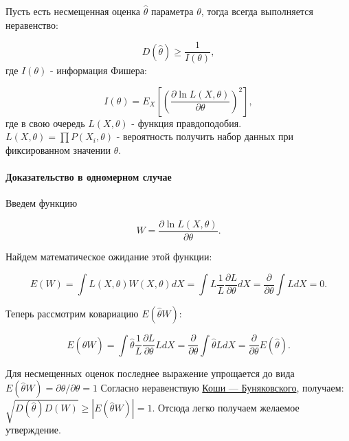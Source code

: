 Пусть есть несмещенная оценка $\hat\theta$ параметра $\theta$, тогда
всегда выполняется неравенство:

\begin{equation}
  D(\hat\theta) \geq \frac{1}{I(\theta)},
\end{equation} где $I(\theta)$ - информация Фишера:

\begin{equation}
  I(\theta) = E_X \left[\left( \frac{\partial \ln L(X,\theta)}{\partial \theta} \right)^2 \right],
\end{equation} где в свою очередь $L(X, \theta)$ - функция
правдоподобия. $L(X,\theta) = \prod{P(X_i,\theta)}$ - вероятность
получить набор данных при фиксированном значении $\theta$.

\paragraph{Доказательство в одномерном случае}

Введем функцию

\begin{equation}
  W = \frac{\partial \ln L(X,\theta)} {\partial \theta}.
\end{equation}

Найдем математическое ожидание этой функции:

\begin{equation}
  E(W) = \int{L(X, \theta) W(X, \theta) dX} = \int{ L \frac{1}{L} \frac{\partial L}{\partial \theta} dX} = \frac{\partial}{\partial \theta} \int{L dX} = 0.
\end{equation}

Теперь рассмотрим ковариацию $E(\hat\theta W)$:

\begin{equation}
  E(\hat\theta W) = \int{\hat\theta \frac{1}{L} \frac{\partial L} {\partial {\theta}} L dX} = \frac{\partial}{\partial \theta} \int{\hat\theta L dX} =  \frac{\partial}{\partial \theta} E(\hat\theta).
\end{equation}

Для несмещенных оценок последнее выражение упрощается до вида
$E(\hat\theta W) = {\partial \theta}/{\partial \theta} = 1$ Согласно
неравенствую
\href{https://ru.wikipedia.org/wiki/\%D0\%9D\%D0\%B5\%D1\%80\%D0\%B0\%D0\%B2\%D0\%B5\%D0\%BD\%D1\%81\%D1\%82\%D0\%B2\%D0\%BE_\%D0\%9A\%D0\%BE\%D1\%88\%D0\%B8_\%E2\%80\%94_\%D0\%91\%D1\%83\%D0\%BD\%D1\%8F\%D0\%BA\%D0\%BE\%D0\%B2\%D1\%81\%D0\%BA\%D0\%BE\%D0\%B3\%D0\%BE}{Коши
--- Буняковского}, получаем:
$\sqrt{D(\hat\theta) D(W)} \geq \left| E(\hat\theta W) \right| = 1$.
Отсюда легко получаем желаемое утверждение.

